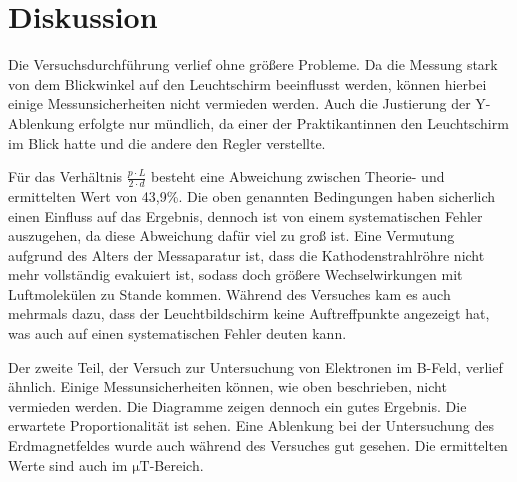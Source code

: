 \section{Diskussion}
\label{sec:Diskussion}

Die Versuchsdurchführung verlief ohne größere Probleme.
Da die Messung stark von dem Blickwinkel auf den Leuchtschirm beeinflusst werden, können hierbei einige Messunsicherheiten nicht vermieden werden.
Auch die Justierung der Y-Ablenkung erfolgte nur mündlich, da einer der Praktikantinnen den Leuchtschirm im Blick hatte und die andere den Regler verstellte.

\noindent
Für das Verhältnis $\frac{p \cdot L}{2\cdot d}$ besteht eine Abweichung zwischen Theorie- und ermittelten Wert von 43,9\%.
Die oben genannten Bedingungen haben sicherlich einen Einfluss auf das Ergebnis, dennoch ist von einem systematischen Fehler auszugehen, da diese Abweichung dafür viel zu groß ist.
Eine Vermutung aufgrund des Alters der Messaparatur ist, dass die Kathodenstrahlröhre nicht mehr vollständig evakuiert ist, sodass doch größere Wechselwirkungen mit Luftmolekülen zu Stande kommen.
Während des Versuches kam es auch mehrmals dazu, dass der Leuchtbildschirm keine Auftreffpunkte angezeigt hat, was auch auf einen systematischen Fehler deuten kann.

\noindent
Der zweite Teil, der Versuch zur Untersuchung von Elektronen im B-Feld, verlief ähnlich.
Einige Messunsicherheiten können, wie oben beschrieben, nicht vermieden werden.
Die Diagramme zeigen dennoch ein gutes Ergebnis.
Die erwartete Proportionalität ist sehen.
Eine Ablenkung bei der Untersuchung des Erdmagnetfeldes wurde auch während des Versuches gut gesehen.
Die ermittelten Werte sind auch im $\si{\micro\tesla}$-Bereich.